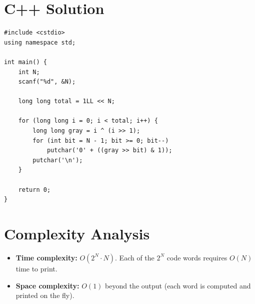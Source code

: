 \documentclass[11pt,a4paper]{article}
\begin{document}
\section{C++ Solution}

\begin{lstlisting}
#include <cstdio>
using namespace std;

int main() {
    int N;
    scanf("%d", &N);

    long long total = 1LL << N;

    for (long long i = 0; i < total; i++) {
        long long gray = i ^ (i >> 1);
        for (int bit = N - 1; bit >= 0; bit--)
            putchar('0' + ((gray >> bit) & 1));
        putchar('\n');
    }

    return 0;
}
\end{lstlisting}

\section{Complexity Analysis}

\begin{itemize}
  \item \textbf{Time complexity:} $O(2^N \cdot N)$. Each of the $2^N$ code words
        requires $O(N)$ time to print.
  \item \textbf{Space complexity:} $O(1)$ beyond the output (each word is computed
        and printed on the fly).
\end{itemize}
\end{document}
